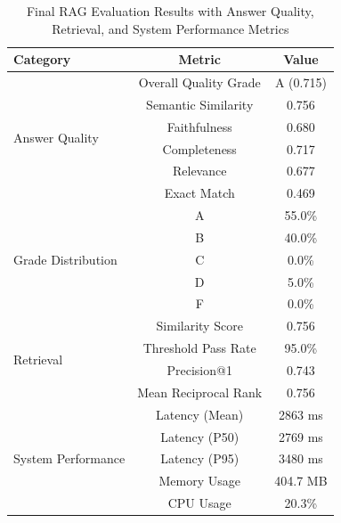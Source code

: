 	\begin{table}[htbp]
		\centering
		\caption{Final RAG Evaluation Results with Answer Quality, Retrieval, and System Performance Metrics}
		\label{tab:rag_results}
		\begin{tabular}{lcc}
			\hline
			\textbf{Category} & \textbf{Metric} & \textbf{Value} \\
			\hline
			\multirow{6}{*}{Answer Quality} 
			& Overall Quality Grade & A (0.715) \\
			& Semantic Similarity   & 0.756 \\
			& Faithfulness          & 0.680 \\
			& Completeness          & 0.717 \\
			& Relevance             & 0.677 \\
			& Exact Match           & 0.469 \\
			\hline
			\multirow{5}{*}{Grade Distribution} 
			& A & 55.0\% \\
			& B & 40.0\% \\
			& C & 0.0\% \\
			& D & 5.0\% \\
			& F & 0.0\% \\
			\hline
			\multirow{4}{*}{Retrieval} 
			& Similarity Score    & 0.756 \\
			& Threshold Pass Rate & 95.0\% \\
			& Precision@1         & 0.743 \\
			& Mean Reciprocal Rank & 0.756 \\
			\hline
			\multirow{5}{*}{System Performance} 
			& Latency (Mean)  & 2863 ms \\
			& Latency (P50)   & 2769 ms \\
			& Latency (P95)   & 3480 ms \\
			& Memory Usage    & 404.7 MB \\
			& CPU Usage       & 20.3\% \\
			\hline
		\end{tabular}
	\end{table}
	
	